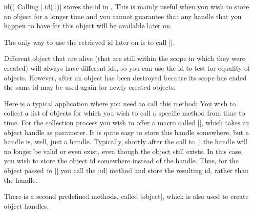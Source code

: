 \begin{predefinedmethod}{id()}
  Calling |.id(||)|  stores the id  in
  . This is mainly useful when you wish to store an
  object for a longer time and you cannot guarantee that any handle
  that you happen to have for this object will be available later on.

  The only way to use the retrieved id later on is to call
  |\pgfooobj|.

  Different object that are alive (that are still within the scope in
  which they were created) will always have different ids, so you can
  use the id to test for equality of objects. However, after an object
  has been destroyed because its scope has ended the same id may be
  used again for newly created objects.

  Here is a typical application where you need to call this method:
  You wish to collect a list of objects for which you wish to call a
  specific method from time to time. For the collection process you
  wish to offer a macro called |\addtoobjectlist|, which takes an
  object handle as parameter. It is quite easy to store this handle
  somewhere, but a handle is, well, just a handle. Typically, shortly
  after the call to |\addtoobjectlist| the handle will no longer be
  valid or even exist, even though the object still exists. In this
  case, you wish to store the object id somewhere instead of the
  handle. Thus, for the object passed to |\addtoobjectlist| you call
  the |id| method and store the resulting id, rather than the handle. 
\end{predefinedmethod}

There is a second predefined methods, called |object|, which is also
used to create object handles.





